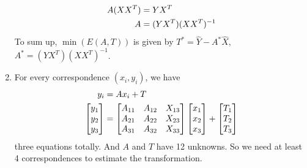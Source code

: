 \documentclass[bwprint]{gmcmthesis}
\numberwithin{figure}{section}
\begin{document}
\begin{enumerate}[label=\alph*.]
\begin{align}
        A(XX^T) &= YX^T \notag \\
        A &= (YX^T)(XX^T)^{-1} \notag
    \end{align}
    To sum up, $\min(E(A, T))$ is given by $T^* = \hat{Y} - A^*\hat{X}$, $A^* = (YX^T)(XX^T)^{-1}$.
    \item For every correspondence $(x_i, y_i)$, we have
    \begin{align}
        y_i &= Ax_i + T \notag \\
        \begin{bmatrix}
            y_1 \\
            y_2 \\
            y_3
        \end{bmatrix} &= \begin{bmatrix}
                A_{11} & A_{12} & X_{13} \\
                A_{21} & A_{22} & X_{23} \\
                A_{31} & A_{32} & X_{33}
            \end{bmatrix}
            \begin{bmatrix}
                x_1 \\
                x_2 \\
                x_3
            \end{bmatrix} +
            \begin{bmatrix}
                T_1 \\
                T_2 \\
                T_3
            \end{bmatrix} \notag
    \end{align}
    three equations totally. And $A$ and $T$ have 12 unknowns. So we need at least 4 correspondences to estimate the transformation.
\end{enumerate}
\end{document}
